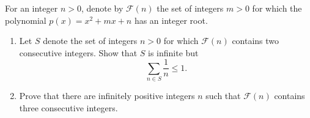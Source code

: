 For an integer $n>0$, denote by $\mathcal{F}\left(n\right)$ the set of integers $m>0$ for which the polynomial $p\left(x\right)=x^2+mx+n$ has an integer root.

\begin{enumerate}[label=(\alph*)]
	\item Let $S$ denote the set of integers $n>0$ for which $\mathcal{F}\left(n\right)$ contains two consecutive integers. Show that $S$ is infinite but \[\displaystyle\sum_{n\in S}\frac{1}{n}\leq1.\]
	\item Prove that there are infinitely positive integers $n$ such that $\mathcal{F}\left(n\right)$ contains three consecutive integers.
\end{enumerate}